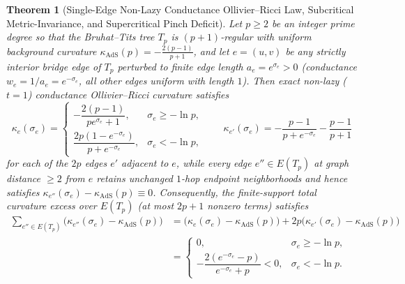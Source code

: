 \documentclass[11pt,a4paper]{article}
\numberwithin{equation}{section}
\theoremstyle{plain}
\newtheorem{theorem}{Theorem}[section]
\theoremstyle{definition}
\theoremstyle{remark}
\newcommand{\Tp}{T_p}
\begin{document}
\begin{theorem}[Single-Edge Non-Lazy Conductance Ollivier--Ricci Law, Subcritical Metric-Invariance, and Supercritical Pinch Deficit]
\label{thm:gauss-bonnet}
Let $p \ge 2$ be an integer prime degree so that the Bruhat--Tits tree $\Tp$ is $(p+1)$-regular with uniform background curvature $\kappa_{\mathrm{AdS}}(p) = -\frac{2(p-1)}{p+1}$, and let $e = (u, v)$ be any strictly interior bridge edge of $\Tp$ perturbed to finite edge length $a_e = e^{\sigma_e} > 0$ (conductance $w_e = 1/a_e = e^{-\sigma_e}$, all other edges uniform with length $1$). Then exact non-lazy ($t = 1$) conductance Ollivier--Ricci curvature satisfies
\begin{equation}
  \kappa_e(\sigma_e) = \begin{cases}
    -\dfrac{2(p-1)}{p e^{\sigma_e} + 1}, & \sigma_e \ge -\ln p, \\[9pt]
    \dfrac{2p(1 - e^{-\sigma_e})}{p + e^{-\sigma_e}}, & \sigma_e < -\ln p,
  \end{cases}
  \qquad
  \kappa_{e'}(\sigma_e) = -\frac{p-1}{p + e^{-\sigma_e}} - \frac{p-1}{p+1}
  \label{eq:curved-kappa}
\end{equation}
for each of the $2p$ edges $e'$ adjacent to $e$, while every edge $e'' \in E(\Tp)$ at graph distance $\ge 2$ from $e$ retains unchanged $1$-hop endpoint neighborhoods and hence satisfies $\kappa_{e''}(\sigma_e) - \kappa_{\mathrm{AdS}}(p) \equiv 0$. Consequently, the finite-support total curvature excess over $E(\Tp)$ (at most $2p+1$ nonzero terms) satisfies
\begin{equation}
\begin{aligned}
  \sum_{e'' \in E(\Tp)} \bigl(\kappa_{e''}(\sigma_e) - \kappa_{\mathrm{AdS}}(p)\bigr)
  &= \bigl(\kappa_e(\sigma_e) - \kappa_{\mathrm{AdS}}(p)\bigr) + 2p\bigl(\kappa_{e'}(\sigma_e) - \kappa_{\mathrm{AdS}}(p)\bigr) \\
  &= \begin{cases}
    0, & \sigma_e \ge -\ln p, \\[6pt]
    -\dfrac{2(e^{-\sigma_e} - p)}{e^{-\sigma_e} + p} < 0, & \sigma_e < -\ln p.
  \end{cases}
\end{aligned}
\label{eq:single-edge-deficit}
\end{equation}
\end{theorem}
\end{document}
